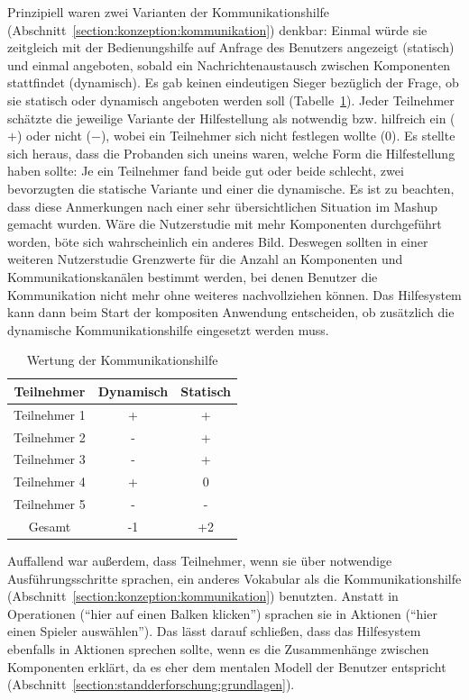 \documentclass[
	headsepline,
	footsepline,
	fontsize=12pt,
	bibliography=totoc
]{scrbook}
\begin{document}
Prinzipiell waren zwei Varianten der Kommunikationshilfe (Abschnitt~\ref{section:konzeption:kommunikation}) denkbar: Einmal würde sie zeitgleich mit der Bedienungshilfe auf Anfrage des Benutzers angezeigt (statisch) und einmal angeboten, sobald ein Nachrichtenaustausch zwischen Komponenten stattfindet (dynamisch). Es gab keinen eindeutigen Sieger bezüglich der Frage, ob sie statisch oder dynamisch angeboten werden soll (Tabelle~\ref{table:paper-mockup-kommunikationshilfe}). Jeder Teilnehmer schätzte die jeweilige Variante der Hilfestellung als notwendig bzw. hilfreich ein ($+$) oder nicht ($-$), wobei ein Teilnehmer sich nicht festlegen wollte (0). Es stellte sich heraus, dass die Probanden sich uneins waren, welche Form die Hilfestellung haben sollte: Je ein Teilnehmer fand beide gut oder beide schlecht, zwei bevorzugten die statische Variante und einer die dynamische. Es ist zu beachten, dass diese Anmerkungen nach einer sehr übersichtlichen Situation im Mashup gemacht wurden. Wäre die Nutzerstudie mit mehr Komponenten durchgeführt worden, böte sich wahrscheinlich ein anderes Bild. Deswegen sollten in einer weiteren Nutzerstudie Grenzwerte für die Anzahl an Komponenten und Kommunikationskanälen bestimmt werden, bei denen Benutzer die Kommunikation nicht mehr ohne weiteres nachvollziehen können. Das Hilfesystem kann dann beim Start der kompositen Anwendung entscheiden, ob zusätzlich die dynamische Kommunikationshilfe eingesetzt werden muss.

\begin{table}[htbp]
	\centering
    \begin{tabular}{c|c|c}
    Teilnehmer   & Dynamisch	& Statisch      \\
    \hline
    Teilnehmer 1 & +			& +  \\ %
    Teilnehmer 2 & -         	& +   \\ %
    Teilnehmer 3 & -         	& +    \\ %
    Teilnehmer 4 & +        	& 0     \\ %
    Teilnehmer 5 & -         	& -      \\ %
    \hline
    Gesamt		& -1			& +2 
    \end{tabular}
    \caption{Wertung der Kommunikationshilfe}
    \label{table:paper-mockup-kommunikationshilfe}
\end{table}

Auffallend war außerdem, dass Teilnehmer, wenn sie über notwendige Ausführungsschritte sprachen, ein anderes Vokabular als die Kommunikationshilfe (Abschnitt~\ref{section:konzeption:kommunikation}) benutzten. Anstatt in Operationen (\enquote{hier auf einen Balken klicken}) sprachen sie in Aktionen (\enquote{hier einen Spieler auswählen}). Das lässt darauf schließen, dass das Hilfesystem ebenfalls in Aktionen sprechen sollte, wenn es die Zusammenhänge zwischen Komponenten erklärt, da es eher dem mentalen Modell der Benutzer entspricht (Abschnitt~\ref{section:standderforschung:grundlagen}).
\end{document}
